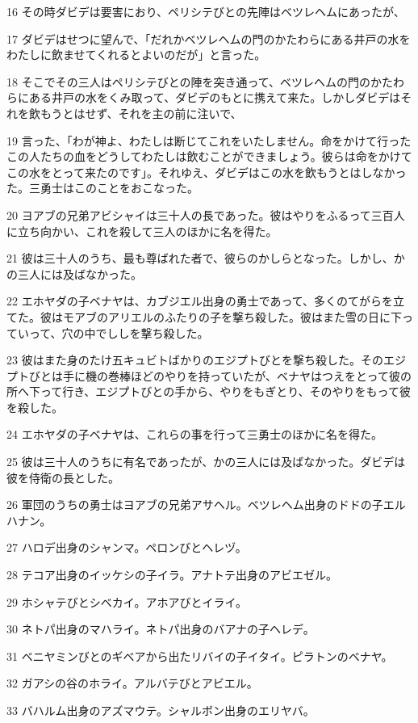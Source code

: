 \par 16 その時ダビデは要害におり、ペリシテびとの先陣はベツレヘムにあったが、
\par 17 ダビデはせつに望んで、「だれかベツレヘムの門のかたわらにある井戸の水をわたしに飲ませてくれるとよいのだが」と言った。
\par 18 そこでその三人はペリシテびとの陣を突き通って、ベツレヘムの門のかたわらにある井戸の水をくみ取って、ダビデのもとに携えて来た。しかしダビデはそれを飲もうとはせず、それを主の前に注いで、
\par 19 言った、「わが神よ、わたしは断じてこれをいたしません。命をかけて行ったこの人たちの血をどうしてわたしは飲むことができましょう。彼らは命をかけてこの水をとって来たのです」。それゆえ、ダビデはこの水を飲もうとはしなかった。三勇士はこのことをおこなった。
\par 20 ヨアブの兄弟アビシャイは三十人の長であった。彼はやりをふるって三百人に立ち向かい、これを殺して三人のほかに名を得た。
\par 21 彼は三十人のうち、最も尊ばれた者で、彼らのかしらとなった。しかし、かの三人には及ばなかった。
\par 22 エホヤダの子ベナヤは、カブジエル出身の勇士であって、多くのてがらを立てた。彼はモアブのアリエルのふたりの子を撃ち殺した。彼はまた雪の日に下っていって、穴の中でししを撃ち殺した。
\par 23 彼はまた身のたけ五キュビトばかりのエジプトびとを撃ち殺した。そのエジプトびとは手に機の巻棒ほどのやりを持っていたが、ベナヤはつえをとって彼の所へ下って行き、エジプトびとの手から、やりをもぎとり、そのやりをもって彼を殺した。
\par 24 エホヤダの子ベナヤは、これらの事を行って三勇士のほかに名を得た。
\par 25 彼は三十人のうちに有名であったが、かの三人には及ばなかった。ダビデは彼を侍衛の長とした。
\par 26 軍団のうちの勇士はヨアブの兄弟アサヘル。ベツレヘム出身のドドの子エルハナン。
\par 27 ハロデ出身のシャンマ。ペロンびとヘレヅ。
\par 28 テコア出身のイッケシの子イラ。アナトテ出身のアビエゼル。
\par 29 ホシャテびとシベカイ。アホアびとイライ。
\par 30 ネトパ出身のマハライ。ネトパ出身のバアナの子ヘレデ。
\par 31 ベニヤミンびとのギベアから出たリバイの子イタイ。ピラトンのベナヤ。
\par 32 ガアシの谷のホライ。アルバテびとアビエル。
\par 33 バハルム出身のアズマウテ。シャルボン出身のエリヤバ。
